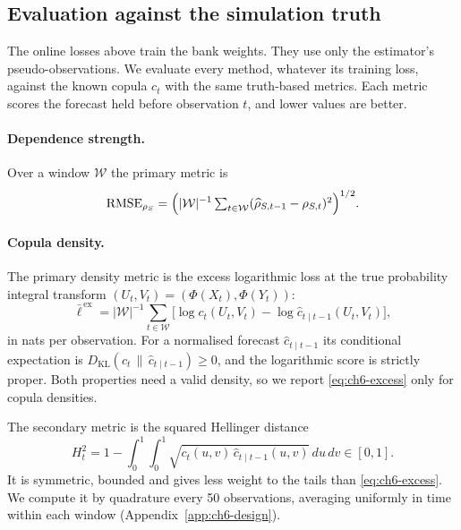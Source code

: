 \subsection{Evaluation against the simulation truth}\label{sec:ch6-metrics}

The online losses above train the bank weights.
They use only the estimator's pseudo-observations.
We evaluate every method, whatever its training loss, against the known copula $c_t$ with the same truth-based metrics.
Each metric scores the forecast held before observation $t$, and lower values are better.

\paragraph{Dependence strength.}
Over a window $\mathcal W$ the primary metric is
\begin{equation}\label{eq:ch6-rmse}
  \mathrm{RMSE}_{\rho_S} = \Bigl(|\mathcal W|^{-1}\textstyle\sum_{t\in\mathcal W}(\widehat\rho_{S,t-1} - \rho_{S,t})^2\Bigr)^{1/2}.
\end{equation}

\paragraph{Copula density.}
The primary density metric is the excess logarithmic loss at the true probability integral transform $(U_t, V_t) = (\Phi(X_t), \Phi(Y_t))$:
\begin{equation}\label{eq:ch6-excess}
  \bar\ell^{\,\mathrm{ex}} = |\mathcal W|^{-1}\textstyle\sum_{t\in\mathcal W}\bigl[\log c_t(U_t, V_t) - \log\widehat c_{t\mid t-1}(U_t, V_t)\bigr],
\end{equation}
in nats per observation.
For a normalised forecast $\widehat c_{t\mid t-1}$ its conditional expectation is $D_{\mathrm{KL}}(c_t\,\|\,\widehat c_{t\mid t-1}) \ge 0$, and the logarithmic score is strictly proper.
Both properties need a valid density, so we report \eqref{eq:ch6-excess} only for copula densities.

The secondary metric is the squared Hellinger distance
\begin{equation}\label{eq:ch6-hellinger}
  H_t^2 = 1 - \int_0^1\!\!\int_0^1\sqrt{c_t(u,v)\,\widehat c_{t\mid t-1}(u,v)}\,du\,dv \in [0, 1].
\end{equation}
It is symmetric, bounded and gives less weight to the tails than \eqref{eq:ch6-excess}.
We compute it by quadrature every 50 observations, averaging uniformly in time within each window (Appendix~\ref{app:ch6-design}).

